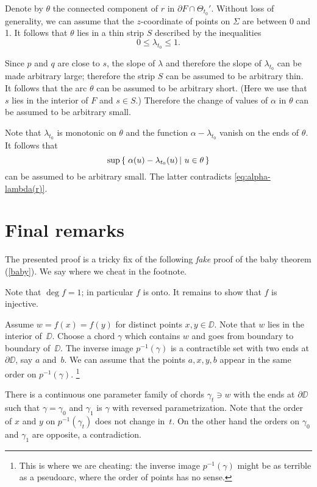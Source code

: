 \documentclass{article}
\begin{document}
Denote by $\theta$ the connected component of $r$ in $\partial F\cap \Theta_{t_0}'$.
Without loss of generality, we can assume that the $z$-coordinate of points on $\Sigma$ are between 0 and 1.
It follows that $\theta$ lies in a thin strip $S$ described by the inequalities
\[0\le \lambda_{t_0}\le 1.\]

Since $p$ and $q$ are close to $s$, 
 the slope of $\lambda$ and therefore the slope of $\lambda_{t_0}$ can be made arbitrary large;
therefore the strip $S$ can be assumed to be arbitrary thin.
It follows that the arc $\theta$ can be assumed to be  arbitrary short.
(Here we use that $s$ lies in the interior of $F$ and $s\in S$.)
Therefore the change of values of $\alpha$ in $\theta$ can be assumed to be arbitrary small.

Note that $\lambda_{t_0}$ is monotonic on $\theta$ and 
the function $\alpha-\lambda_{t_0}$ vanish on the ends of $\theta$.
It follows that 
\[\sup\set{\alpha(u)-\lambda_{t_0}(u)}{u\in\theta}\]
can be assumed to be arbitrary small.
The latter contradicts \ref{eq:alpha-lambda(r)}.
\qeds

\section{Final remarks}

The presented proof is a tricky fix of the following \emph{fake} proof of the baby theorem (\ref{baby}).
We say where we cheat in the footnote.

Note that $\deg f=1$;
in particular $f$ is onto.
It remains to show that $f$ is injective.

Assume $w=f(x)=f(y)$ for distinct points $x,y\in\DD$.
Note that $w$ lies in the interior of~$\DD$.
Choose a chord $\gamma$ which contains $w$ and goes 
from boundary to boundary of~$\DD$.
The inverse image $p^{-1}(\gamma)$ is a contractible set with two ends at $\partial\DD$, say $a$ and~$b$.
We can assume that the points $a,x,y,b$ appear in the same order on $p^{-1}(\gamma)$.%
\footnote{This is where we are cheating: the inverse image $p^{-1}(\gamma)$ might be as terrible as a pseudoarc, where the order of points has no sense.}

There is a continuous one parameter family of chords $\gamma_t\ni w$ with the ends at $\partial \DD$
such that $\gamma=\gamma_0$ and $\gamma_1$ is $\gamma$ with reversed parametrization.
Note that the order of $x$ and $y$ on $p^{-1}(\gamma_t)$ does not change in~$t$.
On the other hand the orders on $\gamma_0$ and $\gamma_1$ are opposite, a contradiction.\qeds
\end{document}
